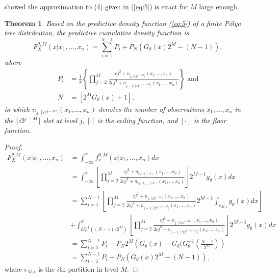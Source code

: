 \documentclass[12pt]{article}
\newtheorem{thm}{Theorem}[subsection]
\newcommand{\polya}{P\'{o}lya}
\begin{document}
\citet{hanson2002} showed the approximation to (4) given in
(\ref{eq:5}) is exact for $M$ large enough.

\begin{thm}
  Based on the predictive density function (\ref{eq:5}) of a
  finite \polya{} tree distribution, 
  the predictive cumulative density function is 
  \begin{equation}
    \label{eq:6}
    F^{\theta,M}_X(x|x_1, \ldots, x_n) = \sum_{i=1}^{N-1} P_{i} + P_N
    \left( G_{\theta}(x)2^M -(N-1) \right),
  \end{equation}
  where
  \begin{align*}
    P_i &= \frac{1}{2} \left\{\prod_{j=2}^M \frac{cj^2 + n_{j,\lceil i2^{j-M}
          \rceil}(x_1, \ldots, x_n)}{2cj^2 + n_{j-1,\lceil
          i2^{j-1-M} \rceil}(x_{1 },\ldots, x_n)} \right\} \mbox{ and}\\
    N & = \left[ 2^{M } G_{\theta}(x)   +1\right],
  \end{align*}
  in which $n_{j,\lceil i2^{j-M}
    \rceil}(x_1, \ldots, x_n)$ denotes the number of observations $x_1,
  \ldots, x_n$ in the $\lceil i2^{j-M}
  \rceil$ slot at level $j$, $\lceil \cdot
  \rceil$ is the ceiling function, and $[ \cdot ]$ is the floor function. 
\end{thm}

\begin{proof}
  \begin{align*}
    F^{\theta,M}_X(x| x_1, \ldots, x_n) & = \int_{-\infty}^x
    f_x^{\theta,M} (x|x_1, \ldots, x_n) dx \\
    & = \int_{-\infty}^x \left[
      \prod_{j=2}^M \frac{cj^2 + n_{\epsilon_1 \cdots \epsilon_j(x) }(x_1 , \ldots, x_n)}{2cj^2
        + n_{\epsilon_1 \cdots \epsilon_{j-1}(x)}(x_1, \ldots, x_n)}
    \right]2^{M-1} g_\theta(x) dx \\
    & =  \sum_{i=1}^{N-1} \left[ \prod_{j=2}^M \frac{cj^2 + n_{j, \lceil i2^{j-M}
          \rceil}(x_1,
        \ldots, x_n)}{2cj^2 + n_{j-1, \lceil i2^{j-1-M}
          \rceil}(x_1, \ldots, x_n)} 2^{M-1}
      \int_{\epsilon_{M,i}} g_{\theta}(x) dx \right] \\
    &+ 
    \int_{G^{-1}_{\theta}((N-1)/2^M)}^x \left[ \prod_{j=2}^M \frac{cj^2 + n_{j, \lceil N2^{j-M}
          \rceil}(x_1,
        \ldots, x_n)}{2cj^2 + n_{j-1, \lceil N2^{j-1-M}
          \rceil}(x_1, \ldots, x_n)}\right] 2^{M-1}
    g_{\theta}(x) dx \\
    & = \sum_{i=1}^{N-1} P_i + P_N 2^M \left( G_{\theta}(x) -
      G_{\theta}(G_{\theta}^{-1}\left( \frac{N-1}{2^M} \right)\right)\\
    & = \sum_{i=1}^{N-1}P_i + P_N \left( G_{\theta}(x) 2^M - (N-1) \right),
  \end{align*}
  where $\epsilon_{M,i}$ is the $i$th partition in level $M$. 
\end{proof}
\end{document}
